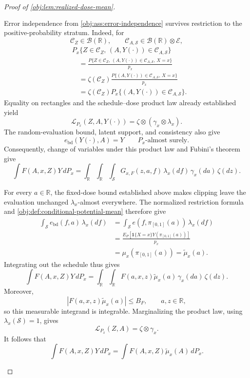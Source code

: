 \begin{proof}[Proof of \cref{obj:lem:realized-dose-mean}]
\begin{enumerate}
Error independence from \cref{obj:ass:error-independence} survives restriction to the positive-probability stratum. Indeed, for
\[
\mathcal C_Z\in\mathcal B(\mathbb R),
\qquad
\mathcal C_{A,\mathcal S}\in\mathcal B(\mathbb R)\otimes\mathcal E,
\]
\[
\begin{aligned}
&P_x\{Z\in\mathcal C_Z,\,(A,Y(\cdot))\in\mathcal C_{A,\mathcal S}\}\\
&\quad=
\frac{P\{Z\in\mathcal C_Z,\,(A,Y(\cdot))\in\mathcal C_{A,\mathcal S},\,X=x\}}{p_x}\\
&\quad=
\zeta(\mathcal C_Z)
\frac{P\{(A,Y(\cdot))\in\mathcal C_{A,\mathcal S},\,X=x\}}{p_x}\\
&\quad=
\zeta(\mathcal C_Z)P_x\{(A,Y(\cdot))\in\mathcal C_{A,\mathcal S}\}.
\end{aligned}
\]
Equality on rectangles and the schedule--dose product law already established yield
\[
\mathcal L_{P_x}(Z,A,Y(\cdot))
=\zeta\otimes(\gamma_x\otimes\lambda_x).
\]
The random-evaluation bound, latent support, and consistency also give
\[
e_{\mathrm{bd}}(Y(\cdot),A)=Y
\qquad P_x\text{-almost surely}.
\]
Consequently, change of variables under this product law and Fubini's theorem give
\[
\int F(A,x,Z)Y\,dP_x
=
\int_{\mathbb R}\int_{\mathbb R}\int_{\mathcal S}
G_{x,F}(z,a,f)\,\lambda_x(df)\,\gamma_x(da)\,\zeta(dz).
\]

For every \(a\in\mathbb R\), the fixed-dose bound established above makes clipping leave the evaluation unchanged \(\lambda_x\)-almost everywhere. The normalized restriction formula and
\cref{obj:def:conditional-potential-mean} therefore give
\[
\begin{aligned}
\int_{\mathcal S}e_{\mathrm{bd}}(f,a)\,\lambda_x(df)
&=\int_{\mathcal S}e(f,\pi_{[0,1]}(a))\,\lambda_x(df)\\
&=\frac{E_P[\mathbf1\{X=x\}Y(\pi_{[0,1]}(a))]}{p_x}\\
&=\mu_x(\pi_{[0,1]}(a))
=\widetilde\mu_x(a).
\end{aligned}
\]
Integrating out the schedule thus gives
\[
\int F(A,x,Z)Y\,dP_x
=
\int_{\mathbb R}\int_{\mathbb R}
F(a,x,z)\widetilde\mu_x(a)\,\gamma_x(da)\,\zeta(dz).
\]
Moreover,
\[
|F(a,x,z)\widetilde\mu_x(a)|\le B_F,
\qquad a,z\in\mathbb R,
\]
so this measurable integrand is integrable. Marginalizing the product law, using
\(\lambda_x(\mathcal S)=1\), gives
\[
\mathcal L_{P_x}(Z,A)=\zeta\otimes\gamma_x.
\]
It follows that
\[
\int F(A,x,Z)Y\,dP_x
=
\int F(A,x,Z)\widetilde\mu_x(A)\,dP_x.
\]


\end{enumerate}
\end{proof}
